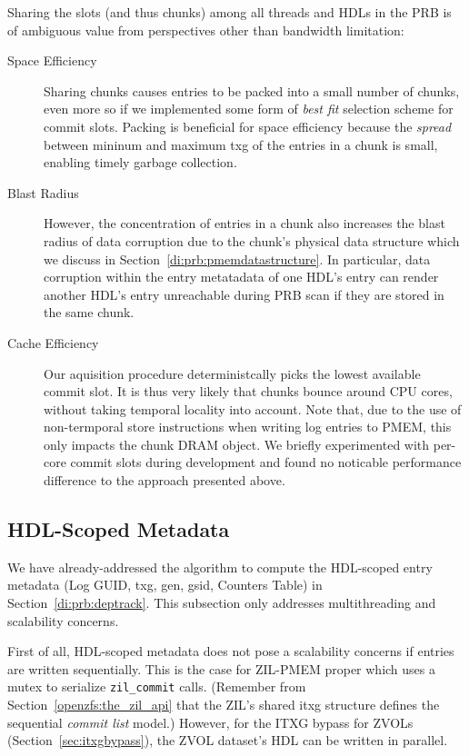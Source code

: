 \documentclass[12pt,a4paper,twoside]{book}
\begin{document}
Sharing the slots (and thus chunks) among all threads and HDLs in the PRB is of ambiguous value from perspectives other than bandwidth limitation:
\begin{description}
    \item[Space Efficiency]
        Sharing chunks causes entries to be packed into a small number of chunks, even more so if we implemented some form of \textit{best fit} selection scheme for commit slots.
        Packing is beneficial for space efficiency because the \textit{spread} between mininum and maximum txg of the entries in a chunk is small, enabling timely garbage collection.
    \item[Blast Radius]
        However, the concentration of entries in a chunk also increases the blast radius of data corruption due to the chunk's physical data structure which we discuss in Section~\ref{di:prb:pmemdatastructure}.
        In particular, data corruption within the entry metatadata of one HDL's entry can render another HDL's entry unreachable during PRB scan if they are stored in the same chunk.
    \item[Cache Efficiency] Our aquisition procedure deterministcally picks the lowest available commit slot.
        It is thus very likely that chunks bounce around CPU cores, without taking temporal locality into account.
        Note that, due to the use of non-termporal store instructions when writing log entries to PMEM, this only impacts the chunk DRAM object.
        We briefly experimented with per-core commit slots during development and found no noticable performance difference to the approach presented above.
\end{description}

\subsection{HDL-Scoped Metadata}\label{di:prb:write:hdlscoped}
We have already-addressed the algorithm to compute the HDL-scoped entry metadata (Log GUID, txg, gen, gsid, Counters Table) in Section~\ref{di:prb:deptrack}.
This subsection only addresses multithreading and scalability concerns.

First of all, HDL-scoped metadata does not pose a scalability concerns if entries are written sequentially.
This is the case for ZIL-PMEM proper which uses a mutex to serialize \lstinline{zil_commit} calls.
(Remember from Section~\ref{openzfs:the_zil_api} that the ZIL's shared itxg structure defines the sequential \textit{commit list} model.)
However, for the ITXG bypass for ZVOLs (Section~\ref{sec:itxgbypass}), the ZVOL dataset's HDL can be written in parallel.
\end{document}
